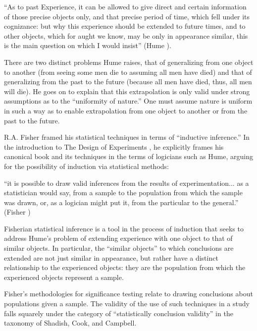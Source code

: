 \documentclass[a4paper,12pt]{article}
\begin{document}
\begin{displayquote}
``As to past Experience, it can be allowed to give direct and certain information of those precise objects only, and that precise period of time, which fell under its cognizance: but why this experience should be extended to future times, and to other objects, which for aught we know, may be only in appearance similar, this is the main question on which I would insist'' (Hume ).
\end{displayquote}

There are two distinct problems Hume raises, that of generalizing from one object to another (from seeing some men die to assuming all men have died) and that of generalizing from the past to the future (because all men have died, thus, all men will die). He goes on to explain that this extrapolation is only valid under strong assumptions as to the ``uniformity of nature.'' One must assume nature is uniform in such a way as to enable extrapolation from one object to another or from the past to the future.

R.A. Fisher framed his statistical techniques in terms of ``inductive inference.'' In the introduction to The Design of Experiments \parencite*{Fisher1935}, he explicitly frames his canonical book and its techniques in the terms of logicians such as Hume, arguing for the possibility of induction via statistical methods:
%
\begin{displayquote}
``it is possible to draw valid inferences from the results of experimentation... as a statistician would say, from a sample to the population from which the sample was drawn, or, as a logician might put it, from the particular to the general.'' (Fisher   )
\end{displayquote}

Fisherian statistical inference is a tool in the process of induction that seeks to address Hume's problem of extending experience with one object to that of similar objects. In particular, the ``similar objects'' to which conclusions are extended are not just similar in appearance, but rather have a distinct relationship to the experienced objects: they are the population from which the experienced objects represent a sample.

Fisher's methodologies for significance testing relate to drawing conclusions about populations given a sample. The validity of the use of such techniques in a study falls squarely under the category of ``statistically conclusion validity'' in the taxonomy of Shadish, Cook, and Campbell.
\end{document}
